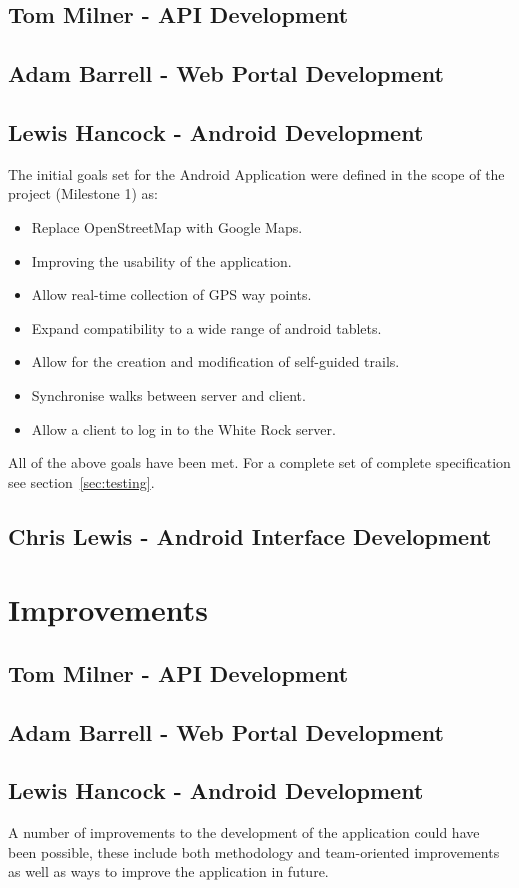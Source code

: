 \documentclass[11pt,a4paper]{report}
\begin{document}
\subsection{Tom Milner - API Development}
\subsection{Adam Barrell - Web Portal Development}
\subsection{Lewis Hancock - Android Development}
The initial goals set for the Android Application were defined in the scope of the project (Milestone 1) as:
\begin{itemize}
\item Replace OpenStreetMap with Google Maps.
\item Improving the usability of the application.
\item Allow real-time collection of GPS way points.
\item Expand compatibility to a wide range of android tablets.
\item Allow for the creation and modification of self-guided trails.
\item Synchronise walks between server and client.
\item Allow a client to log in to the White Rock server.
\end{itemize}
All of the above goals have been met. For a complete set of complete specification see section~\ref{sec:testing}.
\subsection{Chris Lewis - Android Interface Development}

\section{Improvements}
\label{sec:improvements}
\subsection{Tom Milner - API Development}
\subsection{Adam Barrell - Web Portal Development}
\subsection{Lewis Hancock - Android Development}
A number of improvements to the development of the application could have been possible, these include both methodology and team-oriented improvements as well as ways to improve the application in future.
\end{document}
